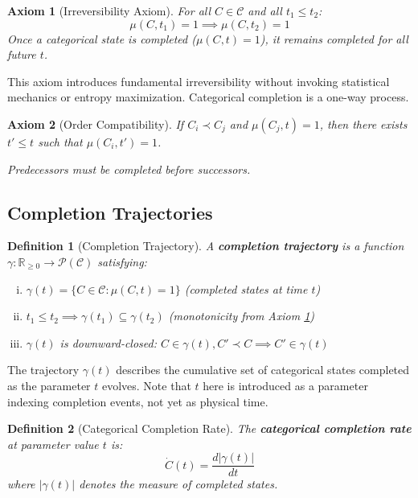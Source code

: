 \documentclass[12pt,a4paper]{article}
\newtheorem{axiom}{Axiom}
\newtheorem{definition}{Definition}
\begin{document}
\begin{axiom}[Irreversibility Axiom]
\label{axiom:irreversibility}
For all $C \in \mathcal{C}$ and all $t_1 \leq t_2$:
\begin{equation}
\mu(C, t_1) = 1 \implies \mu(C, t_2) = 1
\end{equation}
Once a categorical state is completed ($\mu(C, t) = 1$), it remains completed for all future $t$.
\end{axiom}

This axiom introduces fundamental irreversibility without invoking statistical mechanics or entropy maximization. Categorical completion is a one-way process.

\begin{axiom}[Order Compatibility]
\label{axiom:order_compatibility}
If $C_i \prec C_j$ and $\mu(C_j, t) = 1$, then there exists $t' \leq t$ such that $\mu(C_i, t') = 1$.

Predecessors must be completed before successors.
\end{axiom}

\subsection{Completion Trajectories}

\begin{definition}[Completion Trajectory]
\label{def:completion_trajectory}
A \textbf{completion trajectory} is a function $\gamma: \mathbb{R}_{\geq 0} \to \mathcal{P}(\mathcal{C})$ satisfying:
\begin{enumerate}[(i)]
\item $\gamma(t) = \{C \in \mathcal{C} : \mu(C, t) = 1\}$ (completed states at time $t$)
\item $t_1 \leq t_2 \implies \gamma(t_1) \subseteq \gamma(t_2)$ (monotonicity from Axiom \ref{axiom:irreversibility})
\item $\gamma(t)$ is downward-closed: $C \in \gamma(t), C' \prec C \implies C' \in \gamma(t)$
\end{enumerate}
\end{definition}

The trajectory $\gamma(t)$ describes the cumulative set of categorical states completed as the parameter $t$ evolves. Note that $t$ here is introduced as a parameter indexing completion events, not yet as physical time.

\begin{definition}[Categorical Completion Rate]
\label{def:completion_rate}
The \textbf{categorical completion rate} at parameter value $t$ is:
\begin{equation}
\dot{C}(t) = \frac{d|\gamma(t)|}{dt}
\end{equation}
where $|\gamma(t)|$ denotes the measure of completed states.
\end{definition}
\end{document}

